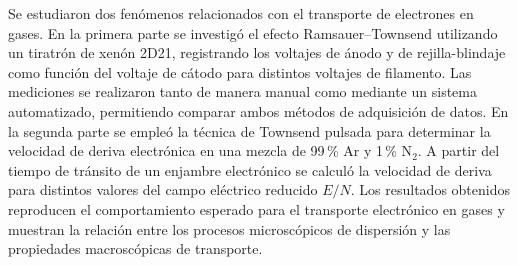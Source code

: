 Se estudiaron dos fenómenos relacionados con el transporte de electrones en gases. En la primera parte se investigó el efecto Ramsauer--Townsend utilizando un tiratrón de xenón 2D21, registrando los voltajes de ánodo y de rejilla-blindaje como función del voltaje de cátodo para distintos voltajes de filamento. Las mediciones se realizaron tanto de manera manual como mediante un sistema automatizado, permitiendo comparar ambos métodos de adquisición de datos. En la segunda parte se empleó la técnica de Townsend pulsada para determinar la velocidad de deriva electrónica en una mezcla de 99\,\% Ar y 1\,\% N$_2$. A partir del tiempo de tránsito de un enjambre electrónico se calculó la velocidad de deriva para distintos valores del campo eléctrico reducido $E/N$. Los resultados obtenidos reproducen el comportamiento esperado para el transporte electrónico en gases y muestran la relación entre los procesos microscópicos de dispersión y las propiedades macroscópicas de transporte.